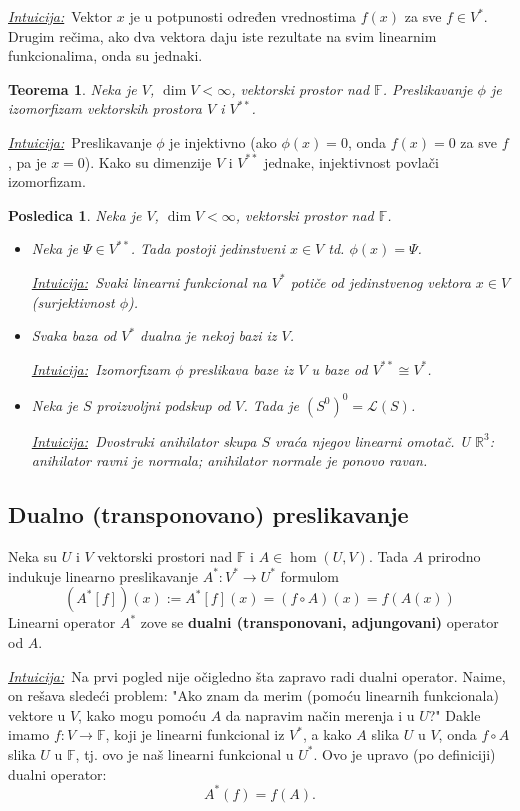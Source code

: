\documentclass[a4paper,12pt,twoside]{report}
\newtheorem{theorem}{Teorema}[section]
\newtheorem{corollary}{Posledica}[theorem]
\numberwithin{algorithm}{section}
\newcommand{\intuicija}{\noindent\underline{\textit{Intuicija:}}\ }
\begin{document}
\intuicija Vektor $x$ je u potpunosti određen vrednostima $f(x)$ za sve $f \in V^*$. Drugim rečima, ako dva vektora daju iste rezultate na svim linearnim funkcionalima, onda su jednaki.
\vfill
\begin{theorem}
    Neka je $V$, $\dim V < \infty$, vektorski prostor nad $\mathbb{F}$. Preslikavanje $\phi$ je izomorfizam vektorskih prostora $V$ i $V^{**}$.
\end{theorem}
\intuicija Preslikavanje $\phi$ je injektivno (ako $\phi(x)=0$, onda $f(x)=0$ za sve $f$, pa je $x=0$). Kako su dimenzije $V$ i $V^{**}$ jednake, injektivnost povlači izomorfizam. 


\newpage
\begin{corollary}
    Neka je $V$, $\dim V < \infty$, vektorski prostor nad $\mathbb{F}$.
\begin{itemize}
    \item \textit{Neka je $\varPsi \in V^{**}$. Tada postoji jedinstveni $x \in V$ td. $\phi(x) = \varPsi$.}
    

    \intuicija Svaki linearni funkcional na $V^*$ potiče od jedinstvenog vektora $x \in V$ (surjektivnost $\phi$).
    \item \textit{Svaka baza od $V^*$ dualna je nekoj bazi iz $V$.}
    
    \intuicija Izomorfizam $\phi$ preslikava baze iz $V$ u baze od $V^{**} \cong V^*$.
    

    \item \textit{Neka je $S$ proizvoljni podskup od $V$. Tada je $(S^0)^0 = \mathcal{L}(S)$.}
    
    
    \intuicija Dvostruki anihilator skupa $S$ vraća njegov linearni omotač. U $\mathbb{R}^3$: anihilator ravni je normala; anihilator normale je ponovo ravan.
\end{itemize}
\end{corollary}

\subsection{Dualno (transponovano) preslikavanje}
\label{dualnoPreslikavanje}
Neka su $U$ i $V$ vektorski prostori nad $\mathbb{F}$ i $A \in \hom  \left(U, V\right)$. Tada $A$ prirodno indukuje linearno preslikavanje $A^*: V^* \to U^*$ formulom
\[ (A^*[f])(x) := A^*[f](x) = (f \circ A)(x) = f(A(x)) \]
Linearni operator $A^*$ zove se \textbf{dualni (transponovani, adjungovani)} operator od $A$.
\medskip

\intuicija Na prvi pogled nije očigledno šta zapravo radi dualni operator. Naime, on rešava sledeći problem: "Ako znam da merim (pomoću linearnih funkcionala)
vektore u $V$, kako mogu pomoću $A$ da napravim način merenja i u $U$?" Dakle imamo $f:V \to \mathbb{F}$, koji je linearni funkcional iz $V^*$, a kako $A$ slika 
$U$ u $V$, onda $f \circ A$ slika $U$ u $\mathbb{F}$, tj. ovo je naš linearni funkcional u $U^*$. Ovo je upravo (po definiciji) dualni operator:
\[ A^*(f) = f(A). \]
\end{document}
